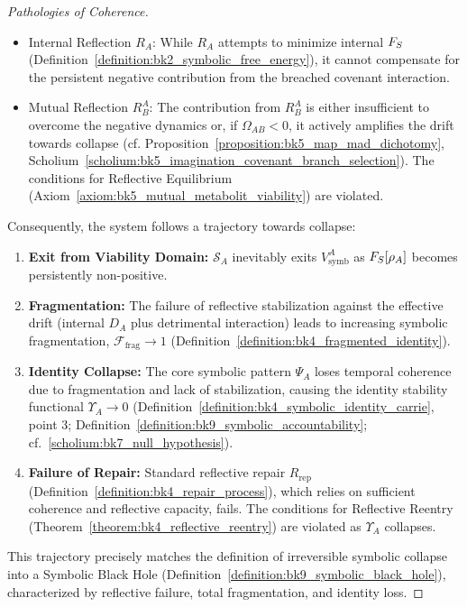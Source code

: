 \begin{proof}[Pathologies of Coherence]
\begin{itemize}
    \item Internal Reflection $R_A$: While $R_A$ attempts to minimize internal $F_S$ (Definition~\ref{definition:bk2_symbolic_free_energy}), it cannot compensate for the persistent negative contribution from the breached covenant interaction.
    \item Mutual Reflection $R^A_B$: The contribution from $R^A_B$ is either insufficient to overcome the negative dynamics or, if $\Omega_{AB} < 0$, it actively amplifies the drift towards collapse (cf. Proposition~\ref{proposition:bk5_map_mad_dichotomy}, Scholium~\ref{scholium:bk5_imagination_covenant_branch_selection}). The conditions for Reflective Equilibrium (Axiom~\ref{axiom:bk5_mutual_metabolit_viability}) are violated.
\end{itemize}
Consequently, the system follows a trajectory towards collapse:
\begin{enumerate}
    \item \textbf{Exit from Viability Domain:} $\mathcal{S}_A$ inevitably exits $V^A_{\text{symb}}$ as $F_S[\rho_A]$ becomes persistently non-positive.
    \item \textbf{Fragmentation:} The failure of reflective stabilization against the effective drift (internal $D_A$ plus detrimental interaction) leads to increasing symbolic fragmentation, $\mathcal{F}_{\text{frag}} \to 1$ (Definition~\ref{definition:bk4_fragmented_identity}).
    \item \textbf{Identity Collapse:} The core symbolic pattern $\Psi_A$ loses temporal coherence due to fragmentation and lack of stabilization, causing the identity stability functional $\Upsilon_A \to 0$ (Definition~\ref{definition:bk4_symbolic_identity_carrie}, point 3; Definition~\ref{definition:bk9_symbolic_accountability}; cf.~\ref{scholium:bk7_null_hypothesis}).
    \item \textbf{Failure of Repair:} Standard reflective repair $R_{\text{rep}}$ (Definition~\ref{definition:bk4_repair_process}), which relies on sufficient coherence and reflective capacity, fails. The conditions for Reflective Reentry (Theorem~\ref{theorem:bk4_reflective_reentry}) are violated as $\Upsilon_A$ collapses.
\end{enumerate}
This trajectory precisely matches the definition of irreversible symbolic collapse into a Symbolic Black Hole (Definition~\ref{definition:bk9_symbolic_black_hole}), characterized by reflective failure, total fragmentation, and identity loss.

\end{proof}

